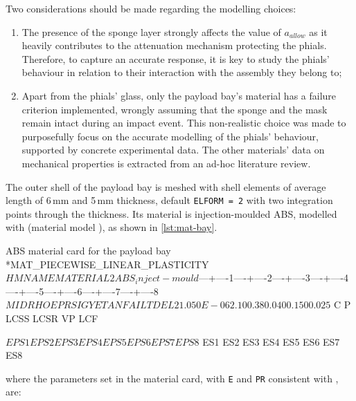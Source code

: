 Two considerations should be made regarding the modelling choices:
\begin{enumerate}
    \item The presence of the sponge layer strongly affects the value of $a_{allow}$ as it heavily contributes to the attenuation mechanism protecting the phials. Therefore, to capture an accurate response, it is key to study the phials' behaviour in relation to their interaction with the assembly they belong to;
    \item Apart from the phials' glass, only the payload bay's material has a failure criterion implemented, wrongly assuming that the sponge and the mask remain intact during an impact event. This non-realistic choice was made to purposefully focus on the accurate modelling of the phials' behaviour, supported by concrete experimental data. The other materials' data on mechanical properties is extracted from an ad-hoc literature review.
\end{enumerate}

The outer shell of the payload bay is meshed with shell elements of average length of 6\,mm and 5\,mm thickness, default \texttt{ELFORM = 2} with two integration points through the thickness. Its material is injection-moulded ABS, modelled with  (material model ), as shown in \cref{lst:mat-bay}.

\begin{dynacard}[label=lst:mat-bay]{ABS material card for the payload bay}
*MAT_PIECEWISE_LINEAR_PLASTICITY
$HMNAME MATERIAL         2ABS_inject-mould
$---+----1----+----2----+----3----+----4----+----5----+----6----+----7----+----8
$      MID       RHO         E        PR      SIGY      ETAN      FAIL      TDEL
         2 1.050E-06      2.10      0.38     0.040     0.150     0.025
$        C         P      LCSS      LCSR        VP       LCF

$     EPS1      EPS2      EPS3      EPS4      EPS5      EPS6      EPS7      EPS8

$      ES1       ES2       ES3       ES4       ES5       ES6       ES7       ES8

\end{dynacard}

\noindent where the parameters set in the material card, with \texttt{E} and \texttt{PR} consistent with \cite{Le2026}, are:

